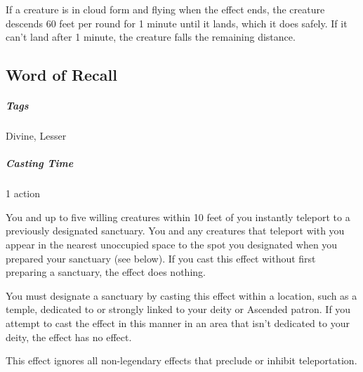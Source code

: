 If a creature is in cloud form and flying when the effect ends, the creature descends 60 feet per round for 1 minute until it lands, which it does safely. If it can’t land after 1 minute, the creature falls the remaining distance.

\subsection{Word of Recall}
\subparagraph*{Tags} Divine, Lesser
\subparagraph*{Casting Time} 1 action

You and up to five willing creatures within 10 feet of you instantly teleport to a previously designated sanctuary. You and any creatures that teleport with you appear in the nearest unoccupied space to the spot you designated when you prepared your sanctuary (see below). If you cast this effect without first preparing a sanctuary, the effect does nothing.

You must designate a sanctuary by casting this effect within a location, such as a temple, dedicated to or strongly linked to your deity or Ascended patron. If you attempt to cast the effect in this manner in an area that isn’t dedicated to your deity, the effect has no effect.

This effect ignores all non-legendary effects that preclude or inhibit teleportation.




